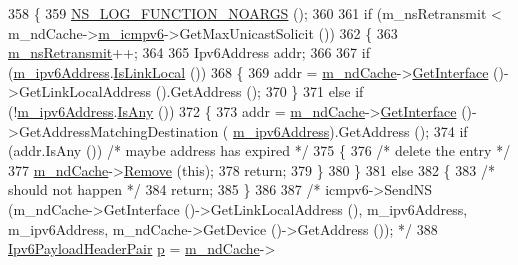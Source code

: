 \begin{DoxyCode}
358 \{
359   \hyperlink{log-macros-disabled_8h_a8f7e4afc291c9d29a65c18ac1f79197b}{NS\_LOG\_FUNCTION\_NOARGS} ();
360 
361   \textcolor{keywordflow}{if} (m\_nsRetransmit < m\_ndCache->\hyperlink{classns3_1_1NdiscCache_adddcf05355092f4623c6defce1f0505a}{m\_icmpv6}->GetMaxUnicastSolicit ())
362     \{
363       \hyperlink{classns3_1_1NdiscCache_1_1Entry_a54e66d2227da0181d02474d51fad198f}{m\_nsRetransmit}++;
364 
365       Ipv6Address addr;
366 
367       \textcolor{keywordflow}{if} (\hyperlink{classns3_1_1NdiscCache_1_1Entry_a3898a5f2de13afc888a20af7f10908a4}{m\_ipv6Address}.\hyperlink{classns3_1_1Ipv6Address_a881c3e796e2afdbd49b2ec630ada1126}{IsLinkLocal} ())
368         \{
369           addr = \hyperlink{classns3_1_1NdiscCache_1_1Entry_ac14c0e838e7dd19bf202c203818d9469}{m\_ndCache}->\hyperlink{classns3_1_1NdiscCache_aaca4169ab2a42da58647e4e4622024c1}{GetInterface} ()->GetLinkLocalAddress ().GetAddress ();
370         \}
371       \textcolor{keywordflow}{else} \textcolor{keywordflow}{if} (!\hyperlink{classns3_1_1NdiscCache_1_1Entry_a3898a5f2de13afc888a20af7f10908a4}{m\_ipv6Address}.\hyperlink{classns3_1_1Ipv6Address_a6f15ff7a41a6ae2171cdeda2a53179b8}{IsAny} ())
372         \{
373           addr = \hyperlink{classns3_1_1NdiscCache_1_1Entry_ac14c0e838e7dd19bf202c203818d9469}{m\_ndCache}->\hyperlink{classns3_1_1NdiscCache_aaca4169ab2a42da58647e4e4622024c1}{GetInterface} ()->GetAddressMatchingDestination (
      \hyperlink{classns3_1_1NdiscCache_1_1Entry_a3898a5f2de13afc888a20af7f10908a4}{m\_ipv6Address}).GetAddress ();
374           \textcolor{keywordflow}{if} (addr.IsAny ()) \textcolor{comment}{/* maybe address has expired */}
375             \{
376               \textcolor{comment}{/* delete the entry */}
377               \hyperlink{classns3_1_1NdiscCache_1_1Entry_ac14c0e838e7dd19bf202c203818d9469}{m\_ndCache}->\hyperlink{classns3_1_1NdiscCache_a4581af837a386eb8dc5559b7094dbb17}{Remove} (\textcolor{keyword}{this});
378               \textcolor{keywordflow}{return};
379             \}
380         \}
381       \textcolor{keywordflow}{else}
382         \{
383           \textcolor{comment}{/* should not happen */}
384           \textcolor{keywordflow}{return};
385         \}
386 
387       \textcolor{comment}{/* icmpv6->SendNS (m\_ndCache->GetInterface ()->GetLinkLocalAddress (), m\_ipv6Address, m\_ipv6Address,
       m\_ndCache->GetDevice ()->GetAddress ()); */}
388       \hyperlink{classns3_1_1NdiscCache_a29c07f4c9da0e923f442f6440666240e}{Ipv6PayloadHeaderPair} \hyperlink{lte__link__budget_8m_ac9de518908a968428863f829398a4e62}{p} = \hyperlink{classns3_1_1NdiscCache_1_1Entry_ac14c0e838e7dd19bf202c203818d9469}{m\_ndCache}->

\end{DoxyCode}
